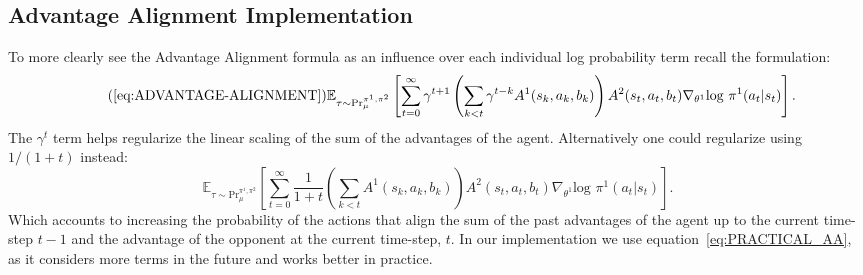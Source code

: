 \documentclass{article} \usepackage{iclr2025_conference,times}
\def\eqref#1{equation~\ref{#1}}
\begin{document}
\subsection{Advantage Alignment Implementation}
\label{app:AA-imp}
To more clearly see the Advantage Alignment formula as an influence over each individual log probability term recall the formulation:
\begin{equation}
    \tag{\ref{eq:ADVANTAGE-ALIGNMENT}}
    \mathbb{E}_{\tau \sim \text{Pr}_{\mu}^{\pi^1, \pi^2}} \left[\sum_{t=0}^\infty \gamma^{t+1} \left(\sum_{k<t} \gamma^{t-k} A^{1}(s_k, a_k, b_k)\right)  A^2(s_t, a_t, b_t)\nabla_{\theta^1}\text{log } \pi^1(a_t|s_t) \right].
\end{equation}
The $\gamma^t$ term helps regularize the linear scaling of the sum of the advantages of the agent. Alternatively one could regularize using $1/(1+t)$ instead:
\begin{equation}
    \label{eq:PRACTICAL_AA}
    \mathbb{E}_{\tau \sim \text{Pr}_{\mu}^{\pi^1, \pi^2}} \left[\sum_{t=0}^\infty \frac{1}{1 + t} \left(\sum_{k<t} A^{1}(s_k, a_k, b_k)\right)  A^2(s_t, a_t, b_t)\nabla_{\theta^1}\text{log } \pi^1(a_t|s_t) \right].
\end{equation}
Which accounts to increasing the probability of the actions that align the sum of the past advantages of the agent up to the current time-step $t-1$ and the advantage of the opponent at the current time-step, $t$. In our implementation we use \eqref{eq:PRACTICAL_AA}, as it considers more terms in the future and works better in practice.
\end{document}

